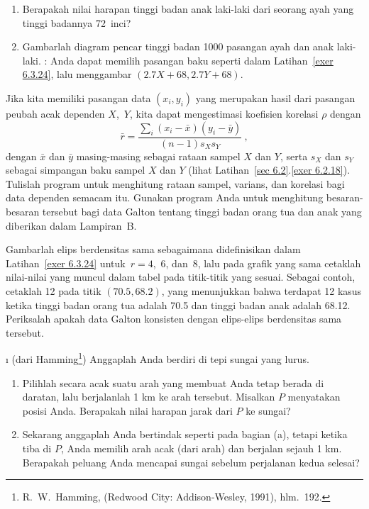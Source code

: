 {\begin{LJSItem}
\begin{enumerate}
\item Berapakah nilai harapan tinggi badan anak laki-laki dari seorang ayah yang
tinggi badannya 72~inci?

\item Gambarlah diagram pencar tinggi badan 1000 pasangan ayah dan anak laki-laki.
: Anda dapat memilih pasangan baku seperti dalam
Latihan~\ref{exer 6.3.24}, lalu menggambar $(2.7X + 68, 2.7Y + 68)$.
\end{enumerate}



\istar\label{exer 6.3.26} Jika kita memiliki pasangan data $(x_i,y_i)$ yang merupakan
hasil dari pasangan peubah acak dependen $X$,~$Y$, kita dapat mengestimasi koefisien
korelasi $\rho$ dengan
$$
\bar r = \frac {\sum_i (x_i - \bar x)(y_i - \bar y)}{(n - 1)s_Xs_Y}\ ,
$$ dengan $\bar x$ dan $\bar y$ masing-masing sebagai rataan sampel $X$ dan $Y$, serta
$s_X$ dan $s_Y$ sebagai simpangan baku sampel $X$ dan $Y$ (lihat
Latihan~\ref{sec 6.2}.\ref{exer 6.2.18}). Tulislah program untuk menghitung rataan
sampel, varians, dan korelasi bagi data dependen semacam itu. Gunakan program Anda
untuk menghitung besaran-besaran tersebut bagi data Galton tentang tinggi badan orang
tua dan anak yang diberikan dalam Lampiran~B.
\par
Gambarlah elips berdensitas sama sebagaimana didefinisikan dalam
Latihan~\ref{exer 6.3.24} untuk~$r = 4$,~6, dan~8, lalu pada grafik yang sama cetaklah
nilai-nilai yang muncul dalam tabel pada titik-titik yang sesuai. Sebagai contoh,
cetaklah 12 pada titik $(70.5,68.2)$, yang menunjukkan bahwa terdapat 12 kasus ketika
tinggi badan orang tua adalah 70.5 dan tinggi badan anak adalah 68.12. Periksalah
apakah data Galton konsisten dengan elips-elips berdensitas sama tersebut.

\i\label{exer 6.3.27} (dari Hamming\footnote{R.~W.~Hamming,
 (Redwood City:
Addison-Wesley, 1991), hlm.~192.}) Anggaplah Anda berdiri di tepi sungai yang lurus.
\begin{enumerate}
\item Pilihlah secara acak suatu arah yang membuat Anda tetap berada di daratan, lalu
berjalanlah 1 km ke arah tersebut. Misalkan $P$ menyatakan posisi Anda. Berapakah nilai
harapan jarak dari $P$ ke sungai?
\item Sekarang anggaplah Anda bertindak seperti pada bagian (a), tetapi ketika tiba di
$P$, Anda memilih arah acak (dari  arah) dan berjalan sejauh 1 km.
Berapakah peluang Anda mencapai sungai sebelum perjalanan kedua selesai?
\end{enumerate}


\end{LJSItem}}
